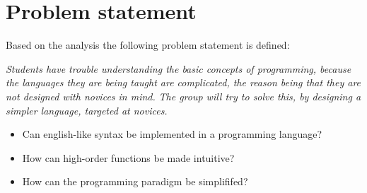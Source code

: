 \newpage
\section{Problem statement}
Based on the analysis the following problem statement is defined:
\begin{center}
	\textit{Students have trouble understanding the basic concepts of programming, because the languages they are being taught are complicated, the reason being that they are not designed with novices in mind.}
	\textit{The group will try to solve this, by designing a simpler language, targeted at novices.}

\begin{itemize}
	\item Can english-like syntax be implemented in a programming language?
	\item How can high-order functions be made intuitive?
	\item How can the programming paradigm be simplififed?
\end{itemize}
\end{center}
